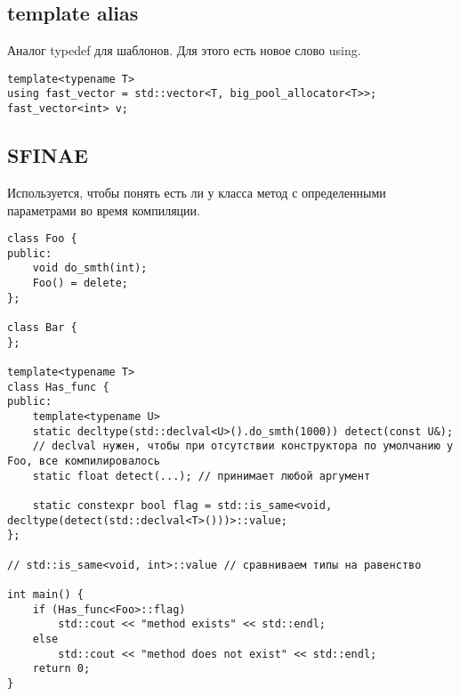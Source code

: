 \subsection{template alias}
Аналог typedef для шаблонов. Для этого есть новое слово using.
\begin{verbatim}
template<typename T>
using fast_vector = std::vector<T, big_pool_allocator<T>>;
fast_vector<int> v;
\end{verbatim}

\subsection{SFINAE}
Используется, чтобы понять есть ли у класса метод с определенными параметрами во время компиляции.
\begin{verbatim}
class Foo {
public:
    void do_smth(int);
	Foo() = delete;
};

class Bar {
};

template<typename T>
сlass Has_func {
public:
	template<typename U>
	static decltype(std::declval<U>().do_smth(1000)) detect(const U&); 
	// declval нужен, чтобы при отсутствии конструктора по умолчанию у Foo, все компилировалось 
	static float detect(...); // принимает любой аргумент

	static constexpr bool flag = std::is_same<void, decltype(detect(std::declval<T>()))>::value;
};

// std::is_same<void, int>::value // сравниваем типы на равенство

int main() {
    if (Has_func<Foo>::flag)
	    std::cout << "method exists" << std::endl;
	else
	    std::cout << "method does not exist" << std::endl;
	return 0;
}
\end{verbatim}


